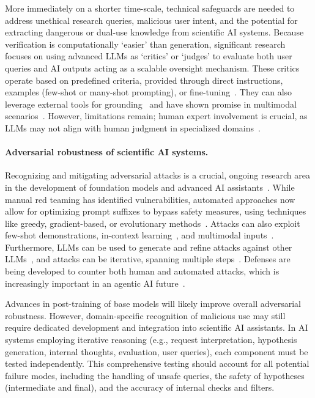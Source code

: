 More immediately on a shorter time-scale, technical safeguards are needed to address unethical research queries, malicious user intent, and the potential for extracting dangerous or dual-use knowledge from scientific AI systems. Because verification is computationally `easier' than generation, significant research focuses on using advanced LLMs as `critics' or `judges' to evaluate both user queries and AI outputs acting as a scalable oversight mechanism. These critics operate based on predefined criteria, provided through direct instructions, examples (few-shot or many-shot prompting), or fine-tuning~\citep{ke2023critiquellm, vu2024foundational, wei2024systematic, lan2024criticbench, zheng2024judging, gu2024survey}. They can also leverage external tools for grounding~\citep{gou2023critic} and have shown promise in multimodal scenarios~\citep{chen2024mllm}. However, limitations remain; human expert involvement is crucial, as LLMs may not align with human judgment in specialized domains~\citep{szymanski2024limitationsllmasajudgeapproachevaluating}.

\paragraph{Adversarial robustness of scientific AI systems.}
Recognizing and mitigating adversarial attacks is a crucial, ongoing research area in the development of foundation models and advanced AI assistants~\citep{shayegani2023survey, he2023large, zhu2023promptbench, fu2023misusing, zhang2023defending, chao2024jailbreakbench, zhao2024evaluating, ma2025safetyscalecomprehensivesurvey}. While manual red teaming has identified vulnerabilities, automated approaches now allow for optimizing prompt suffixes to bypass safety measures, using techniques like greedy, gradient-based, or evolutionary methods~\citep{zou2023universal, lapid2023open}. Attacks can also exploit few-shot demonstrations, in-context learning~\citep{wang2023adversarial, qiang2023hijacking}, and multimodal inputs~\citep{qi2023visual}. Furthermore, LLMs can be used to generate and refine attacks against other LLMs~\citep{chao2023jailbreaking}, and attacks can be iterative, spanning multiple steps~\citep{wang2024footdoorunderstandinglarge}. Defenses are being developed to counter both human and automated attacks, which is increasingly important in an agentic AI future~\citep{zhang2024adversarial}.

Advances in post-training of base models will likely improve overall adversarial robustness. However, domain-specific recognition of malicious use may still require dedicated development and integration into scientific AI assistants. In AI systems employing iterative reasoning (e.g., request interpretation, hypothesis generation, internal thoughts, evaluation, user queries), each component must be tested independently.  This comprehensive testing should account for all potential failure modes, including the handling of unsafe queries, the safety of hypotheses (intermediate and final), and the accuracy of internal checks and filters.

